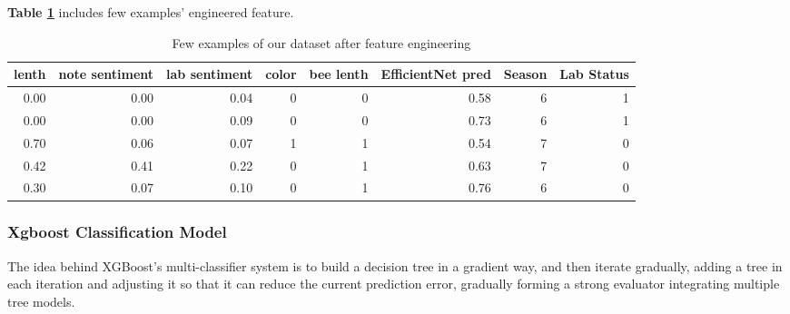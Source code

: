 \documentclass[12pt]{article}
\begin{document}
\textbf{Table \ref{tab:examples}} includes few examples' engineered feature.
\begin{table}[htbp]
	\centering
	\caption{Few examples of our dataset after feature engineering}
	  \begin{tabular}{rrrrrrrr}
	  \toprule
	  \multicolumn{1}{l}{lenth} & \multicolumn{1}{l}{note sentiment} & \multicolumn{1}{l}{lab sentiment} & \multicolumn{1}{l}{color} & \multicolumn{1}{l}{bee lenth} & \multicolumn{1}{l}{EfficientNet pred} & \multicolumn{1}{l}{Season} & \multicolumn{1}{l}{Lab Status} \\
	  \midrule
	  0.00  & 0.00  & 0.04  & 0     & 0     & 0.58  & 6     & 1 \\
	  \rowcolor{mygray}
	  0.00  & 0.00  & 0.09  & 0     & 0     & 0.73  & 6     & 1 \\
	  0.70  & 0.06  & 0.07  & 1     & 1     & 0.54  & 7     & 0 \\
	  \rowcolor{mygray}
	  0.42  & 0.41  & 0.22  & 0     & 1     & 0.63  & 7     & 0 \\
	  0.30  & 0.07  & 0.10  & 0     & 1     & 0.76  & 6     & 0 \\
	  \bottomrule
	  \end{tabular}%
	\label{tab:examples}%
  \end{table}%
  
  
\subsubsection{Xgboost Classification Model}

The idea behind XGBoost's multi-classifier system is to build a decision tree in a gradient way, and then iterate gradually, adding a tree in each iteration and adjusting it so that it can reduce the current prediction error, gradually forming a strong evaluator integrating multiple tree models\cite{Xgboost}.
\end{document}
